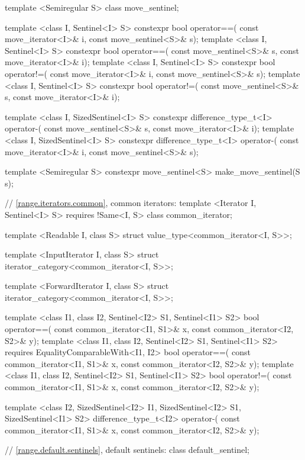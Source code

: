 {\begin{codeblock}
{{    template <Semiregular S> class move_sentinel;

    template <class I, Sentinel<I> S>
      constexpr bool operator==(
        const move_iterator<I>& i, const move_sentinel<S>& s);
    template <class I, Sentinel<I> S>
      constexpr bool operator==(
        const move_sentinel<S>& s, const move_iterator<I>& i);
    template <class I, Sentinel<I> S>
      constexpr bool operator!=(
        const move_iterator<I>& i, const move_sentinel<S>& s);
    template <class I, Sentinel<I> S>
      constexpr bool operator!=(
        const move_sentinel<S>& s, const move_iterator<I>& i);

    template <class I, SizedSentinel<I> S>
      constexpr difference_type_t<I> operator-(
        const move_sentinel<S>& s, const move_iterator<I>& i);
    template <class I, SizedSentinel<I> S>
      constexpr difference_type_t<I> operator-(
        const move_iterator<I>& i, const move_sentinel<S>& s);

    template <Semiregular S>
      constexpr move_sentinel<S> make_move_sentinel(S s);

    // \ref{range.iterators.common}, common iterators:
    template <Iterator I, Sentinel<I> S>
      requires !Same<I, S>
    class common_iterator;

    template <Readable I, class S>
    struct value_type<common_iterator<I, S>>;

    template <InputIterator I, class S>
    struct iterator_category<common_iterator<I, S>>;

    template <ForwardIterator I, class S>
    struct iterator_category<common_iterator<I, S>>;

    template <class I1, class I2, Sentinel<I2> S1, Sentinel<I1> S2>
    bool operator==(
      const common_iterator<I1, S1>& x, const common_iterator<I2, S2>& y);
    template <class I1, class I2, Sentinel<I2> S1, Sentinel<I1> S2>
      requires EqualityComparableWith<I1, I2>
    bool operator==(
      const common_iterator<I1, S1>& x, const common_iterator<I2, S2>& y);
    template <class I1, class I2, Sentinel<I2> S1, Sentinel<I1> S2>
    bool operator!=(
      const common_iterator<I1, S1>& x, const common_iterator<I2, S2>& y);

    template <class I2, SizedSentinel<I2> I1, SizedSentinel<I2> S1, SizedSentinel<I1> S2>
    difference_type_t<I2> operator-(
      const common_iterator<I1, S1>& x, const common_iterator<I2, S2>& y);

    // \ref{range.default.sentinels}, default sentinels:
    class default_sentinel;

}}
\end{codeblock}}
